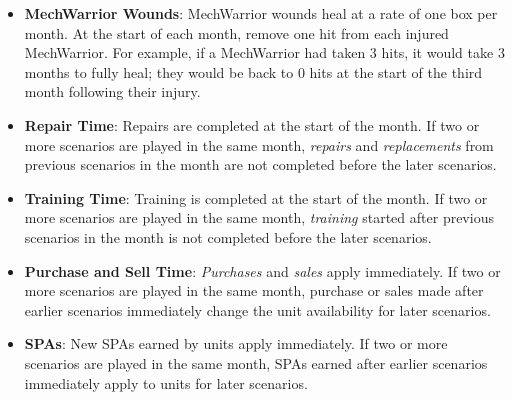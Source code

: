 \begin{itemize}

\item {\bfseries MechWarrior Wounds}: MechWarrior wounds heal at a rate of one box per month.
At the start of each month, remove one hit from each injured MechWarrior.
For example, if a MechWarrior had taken 3 hits, it would take 3 months to fully heal; they would be back to 0 hits at the start of the third month following their injury.

\item {\bfseries Repair Time}: Repairs are completed at the start of the month.
If two or more scenarios are played in the same month, \emph{repairs} and \emph{replacements} from previous scenarios in the month are not completed before the later scenarios.

\item {\bfseries Training Time}: Training is completed at the start of the month.
If two or more scenarios are played in the same month, \emph{training} started after previous scenarios in the month is not completed before the later scenarios.

\item {\bfseries Purchase and Sell Time}: \emph{Purchases} and \emph{sales} apply immediately.
If two or more scenarios are played in the same month, purchase or sales made after earlier scenarios immediately change the unit availability for later scenarios.

\item {\bfseries SPAs}: New SPAs earned by units apply immediately.
If two or more scenarios are played in the same month, SPAs earned after earlier scenarios immediately apply to units for later scenarios.

\end{itemize}
